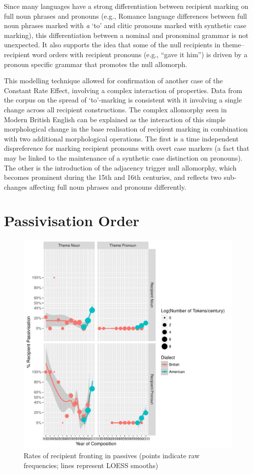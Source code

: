 	Since many languages have a strong differentiation between recipient marking on full noun phrases and pronouns (e.g., Romance language differences between full noun phrases marked with \textit{a} `to' and clitic pronouns marked with synthetic case marking), this differentiation between a nominal and pronominal grammar is not unexpected. It also supports the idea that some of the null recipients in theme--recipient word orders with recipient pronouns (e.g., ``gave it him'') is driven by a pronoun specific grammar that promotes the null allomorph.

	This modelling technique allowed for confirmation of another case of the Constant Rate Effect, involving a complex interaction of properties. Data from the corpus on the spread of `to'-marking is consistent with it involving a single change across all recipient constructions. The complex allomorphy seen in Modern British English can be explained as the interaction of this simple morphological change in the base realisation of recipient marking in combination with two additional morphological operations. The first is a time independent dispreference for marking recipient pronouns with overt case markers (a fact that may be linked to the maintenance of a synthetic case distinction on pronouns). The other is the introduction of the adjacency trigger null allomorphy, which becomes prominent during the 15th and 16th centuries, and reflects two sub-changes affecting full noun phrases and pronouns differently.

\section{Passivisation Order}
	\begin{figure}[p!]
		\includegraphics[width=.9\linewidth]{../images/rec-pas-graph}
		\caption{Rates of recipient fronting in passives (points indicate raw frequencies; lines represent LOESS smooths)}
		\label{fig:rec-pas}
	\end{figure}


